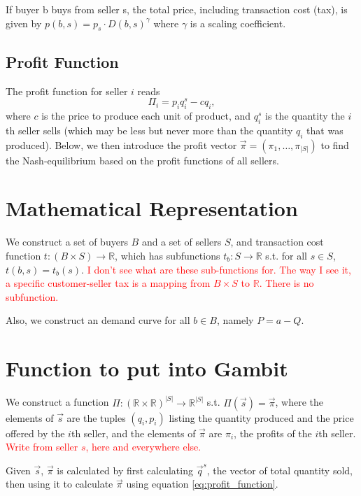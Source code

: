\documentclass[11pt]{article}
\newcommand{\R}{\mathds {R}}
\newcommand{\red}[1]{\textcolor{red}{#1}} %
\begin{document}
If buyer b buys from seller s, the total price, including transaction cost
(tax), is given by $p(b,s) = p_s  \cdot D(b,s)^\gamma$ where $\gamma$ is a scaling
coefficient. 

\subsection{Profit Function}

The profit function for seller $i$ reads
\begin{equation}
    \Pi_i = p_iq_i^s - cq_i, 
    \label{eq:profit_function}
\end{equation}
where $c$ is the price to produce each unit of product, and $q_i^s$ is the quantity the $i$th seller sells
(which may be less but never more than the quantity $q_i$ that was produced). 
Below, we then introduce the profit vector $\vec{\pi} = (\pi_1, \ldots, \pi_{|S|})$
to find the Nash-equilibrium based on the profit functions of all sellers.


\section{Mathematical Representation}
We construct a set of buyers $B$ and a set of sellers $S$, and transaction cost
function $t: (B\times S)\rightarrow \R$, which has subfunctions $t_b:
S\rightarrow \R$ s.t. for all $s\in S$, $t(b,s) = t_b(s)$.
\red{
I don't see what are these sub-functions for. 
The way I see it, a specific customer-seller tax is a mapping from $B \times S$ to $\R$.
There is no subfunction.}

Also, we construct an demand curve for all $b\in B$, namely $P = a - Q$.

\section{Function to put into Gambit}

We construct a function $\Pi : (\R\times\R)^{|S|} \rightarrow \R^{|S|}$ s.t.
$\Pi(\vec{s}) = \vec{\pi}$, where the elements of $\vec{s}$ are the tuples
$(q_i,p_i)$ listing the quantity produced and the price offered by the $i$th
seller, and the elements of $\vec{\pi}$ are $\pi_i$, the profits of the $i$th
seller. \red{Write from seller $s$, here and everywhere else.}

Given $\vec{s}$, $\vec{\pi}$ is calculated by first calculating $\vec{q}^s$, the
vector of total quantity sold, then using it to calculate $\vec{\pi}$ using 
equation \eqref{eq:profit_function}.  
\end{document}

